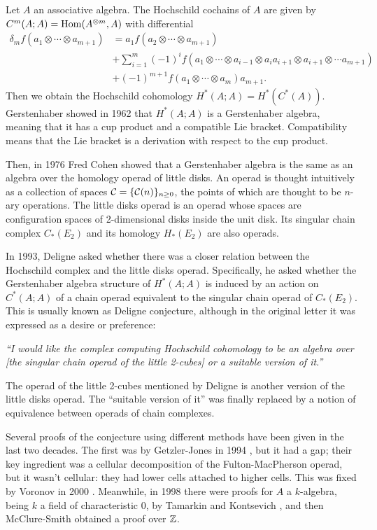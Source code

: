\documentclass[TFM.tex]{subfiles}
\begin{document}

Let $A$ an associative algebra. The Hochschild cochains of $A$ are given by $C^m(A;A)=\operatorname{Hom}(A^{\otimes m},A)$ with differential 
\begin{align*}
\delta_m f(a_1\otimes\cdots\otimes a_{m+1})&=a_1f(a_2\otimes\cdots\otimes a_{m+1})\\
& +\sum_{i=1}^m(-1)^if(a_1\otimes\cdots\otimes a_{i-1}\otimes a_ia_{i+1}\otimes a_{i+1}\otimes\cdots a_{m+1})\\
& +(-1)^{m+1}f(a_1\otimes\cdots\otimes a_m)a_{m+1}.
\end{align*}
Then we obtain the Hochschild cohomology $H^*(A;A)=H^*(C^*(A))$. Gerstenhaber showed in 1962 \cite{Gerstenhaber} that $H^*(A;A)$ is a Gerstenhaber algebra, meaning that it has a cup product and a compatible Lie bracket. Compatibility means that the Lie bracket is a derivation with respect to the cup product.

Then, in 1976 Fred Cohen \cite{cuentas} showed that a Gerstenhaber algebra is the same as an algebra over the homology operad of little disks. An operad is thought intuitively as a collection of spaces $\mathcal{C}=\{\mathcal{C}(n)\}_{n\geq 0}$, the points of which are thought to be $n$-ary operations. The little disks operad is an operad whose spaces are configuration spaces of 2-dimensional disks inside the unit disk. Its singular chain complex $C_*(E_2)$ and its homology $H_*(E_2)$ are also operads. 

In 1993, Deligne asked \cite{deligne} whether there was a closer relation between the Hochschild complex and the little disks operad. Specifically, he asked whether the Gerstenhaber algebra structure of $H^*(A;A)$ is induced by an action on $C^*(A;A)$ of a chain operad
equivalent to the singular chain operad of $C_*(E_2)$. This is usually known as Deligne conjecture, although in the original letter it was expressed as a desire or preference:

\emph{``I would
like the complex computing Hochschild cohomology to be an algebra over [the singular chain
operad of the little 2-cubes] or a suitable version of it.''}

The operad of the little 2-cubes mentioned by Deligne is another version of the little disks operad. The ``suitable version of it'' was finally replaced by a notion of equivalence between operads of chain complexes.

Several proofs of the conjecture using different methods have been given in the last two decades. The first was by Getzler-Jones in 1994 \cite{GJ}, but it had a gap; their key ingredient was a cellular decomposition of the Fulton-MacPherson operad, but it wasn’t cellular: they had
lower cells attached to higher cells. This was fixed by Voronov in 2000 \cite{VO}. Meanwhile, in 1998 there were proofs for $A$ a $k$-algebra, being $k$ a field of characteristic 0, by Tamarkin and Kontsevich \cite{tk}, and then McClure-Smith \cite{McClure} obtained a proof over $\mathbb{Z}$.
\end{document}
